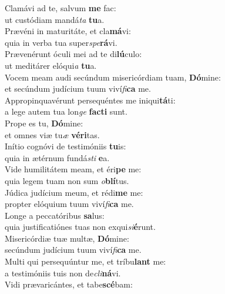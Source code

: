 \evenverse Clamávi ad te, salvum \textbf{me} fac:~\*\\
\evenverse ut custódiam mandá\textit{ta} \textbf{tu}a.\\
\oddverse Prævéni in maturitáte, et cla\textbf{má}vi:~\*\\
\oddverse quia in verba tua super\textit{spe}\textbf{rá}vi.\\
\evenverse Prævenérunt óculi mei ad te di\textbf{lú}culo:~\*\\
\evenverse ut meditárer elóqui\textit{a} \textbf{tu}a.\\
\oddverse Vocem meam audi secúndum misericórdiam tuam, \textbf{Dó}mine:~\*\\
\oddverse et secúndum judícium tuum viví\textit{fi}\textbf{ca} me.\\
\evenverse Appropinquavérunt persequéntes me iniqui\textbf{tá}ti:~\*\\
\evenverse a lege autem tua lon\textit{ge} \textbf{fa}\textbf{cti} sunt.\\
\oddverse Prope es tu, \textbf{Dó}mine:~\*\\
\oddverse et omnes viæ tu\textit{æ} \textbf{vé}\textbf{ri}tas.\\
\evenverse Inítio cognóvi de testimóniis \textbf{tu}is:~\*\\
\evenverse quia in ætérnum fundá\textit{sti} \textbf{e}a.\\
\oddverse Vide humilitátem meam, et éri\textbf{pe} me:~\*\\
\oddverse quia legem tuam non sum \textit{o}\textbf{blí}tus.\\
\evenverse Júdica judícium meum, et rédi\textbf{me} me:~\*\\
\evenverse propter elóquium tuum viví\textit{fi}\textbf{ca} me.\\
\oddverse Longe a peccatóribus \textbf{sa}lus:~\*\\
\oddverse quia justificatiónes tuas non exqui\textit{si}\textbf{é}runt.\\
\evenverse Misericórdiæ tuæ multæ, \textbf{Dó}mine:~\*\\
\evenverse secúndum judícium tuum viví\textit{fi}\textbf{ca} me.\\
\oddverse Multi qui persequúntur me, et tríbu\textbf{lant} me:~\*\\
\oddverse a testimóniis tuis non de\textit{cli}\textbf{ná}vi.\\
\evenverse Vidi prævaricántes, et tabe\textbf{scé}bam:~\*\\
